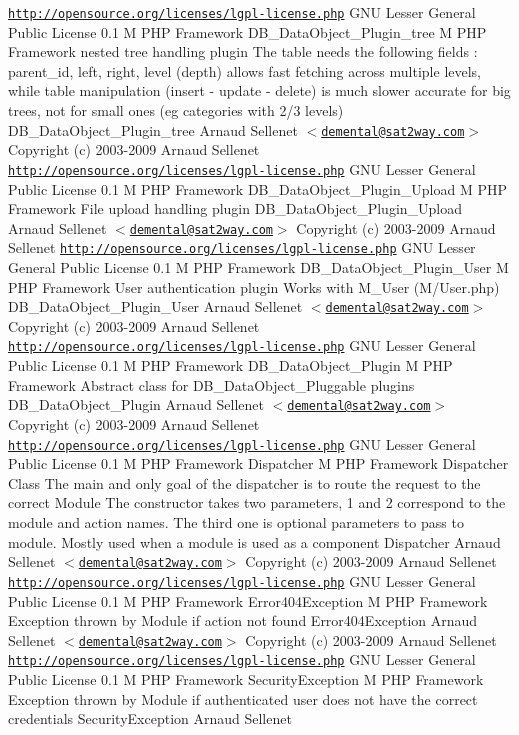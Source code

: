 \begin{Desc}
\href{http://opensource.org/licenses/lgpl-license.php}{\tt http://opensource.org/licenses/lgpl-license.php} GNU Lesser General Public License  0.1  M PHP Framework   DB\_\-DataObject\_\-Plugin\_\-tree  M PHP Framework  nested tree handling plugin The table needs the following fields : parent\_\-id, left, right, level (depth) allows fast fetching across multiple levels, while table manipulation (insert - update - delete) is much slower accurate for big trees, not for small ones (eg categories with 2/3 levels)   DB\_\-DataObject\_\-Plugin\_\-tree  Arnaud Sellenet $<$\href{mailto:demental@sat2way.com}{\tt demental@sat2way.com}$>$  Copyright (c) 2003-2009 Arnaud Sellenet  \href{http://opensource.org/licenses/lgpl-license.php}{\tt http://opensource.org/licenses/lgpl-license.php} GNU Lesser General Public License  0.1  M PHP Framework   DB\_\-DataObject\_\-Plugin\_\-Upload  M PHP Framework  File upload handling plugin   DB\_\-DataObject\_\-Plugin\_\-Upload  Arnaud Sellenet $<$\href{mailto:demental@sat2way.com}{\tt demental@sat2way.com}$>$  Copyright (c) 2003-2009 Arnaud Sellenet  \href{http://opensource.org/licenses/lgpl-license.php}{\tt http://opensource.org/licenses/lgpl-license.php} GNU Lesser General Public License  0.1  M PHP Framework   DB\_\-DataObject\_\-Plugin\_\-User  M PHP Framework  User authentication plugin Works with M\_\-User (M/User.php)   DB\_\-DataObject\_\-Plugin\_\-User  Arnaud Sellenet $<$\href{mailto:demental@sat2way.com}{\tt demental@sat2way.com}$>$  Copyright (c) 2003-2009 Arnaud Sellenet  \href{http://opensource.org/licenses/lgpl-license.php}{\tt http://opensource.org/licenses/lgpl-license.php} GNU Lesser General Public License  0.1  M PHP Framework   DB\_\-DataObject\_\-Plugin  M PHP Framework  Abstract class for DB\_\-DataObject\_\-Pluggable plugins   DB\_\-DataObject\_\-Plugin  Arnaud Sellenet $<$\href{mailto:demental@sat2way.com}{\tt demental@sat2way.com}$>$  Copyright (c) 2003-2009 Arnaud Sellenet  \href{http://opensource.org/licenses/lgpl-license.php}{\tt http://opensource.org/licenses/lgpl-license.php} GNU Lesser General Public License  0.1  M PHP Framework   Dispatcher  M PHP Framework  Dispatcher Class The main and only goal of the dispatcher is to route the request to the correct Module The constructor takes two parameters, 1 and 2 correspond to the module and action names. The third one is optional parameters to pass to module. Mostly used when a module is used as a component   Dispatcher  Arnaud Sellenet $<$\href{mailto:demental@sat2way.com}{\tt demental@sat2way.com}$>$  Copyright (c) 2003-2009 Arnaud Sellenet  \href{http://opensource.org/licenses/lgpl-license.php}{\tt http://opensource.org/licenses/lgpl-license.php} GNU Lesser General Public License  0.1  M PHP Framework   Error404Exception  M PHP Framework  Exception thrown by Module if action not found   Error404Exception  Arnaud Sellenet $<$\href{mailto:demental@sat2way.com}{\tt demental@sat2way.com}$>$  Copyright (c) 2003-2009 Arnaud Sellenet  \href{http://opensource.org/licenses/lgpl-license.php}{\tt http://opensource.org/licenses/lgpl-license.php} GNU Lesser General Public License  0.1  M PHP Framework   SecurityException  M PHP Framework  Exception thrown by Module if authenticated user does not have the correct credentials   SecurityException  Arnaud Sellenet 
\end{Desc}
